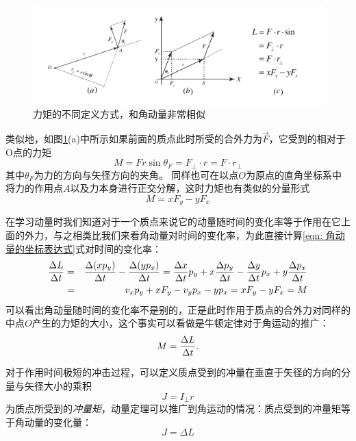 \begin{figure}[htbp]
\begin{center}
\includegraphics{images/angular-momentum-def-torque.pdf}
\caption{力矩的不同定义方式，和角动量非常相似}
\label{fig: def of torque}
\end{center}
\end{figure}
类似地，如图\ref{fig: def of torque}(a)中所示如果前面的质点此时所受的合外力为$\vec{F}$，它受到的相对于O点的力矩
\begin{equation}
M = F r \sin\theta_F = F_\perp\cdot r=F\cdot r_\perp
\end{equation}
其中$\theta_F$为力的方向与矢径方向的夹角。
同样也可在以点$O$为原点的直角坐标系中将力的作用点$A$以及力本身进行正交分解，这时力矩也有类似的分量形式
\begin{equation}\label{eqn: 力矩的分量形式}
M = xF_y - yF_x
\end{equation}

在学习动量时我们知道对于一个质点来说它的动量随时间的变化率等于作用在它上面的外力，与之相类比我们来看角动量对时间的变化率，为此直接计算\ref{eqn: 角动量的坐标表达式}式对时间的变化率：
\begin{eqnarray*}
\frac{\Delta L}{\Delta t}&=&\frac{\Delta (xp_y)}{\Delta t}-\frac{\Delta (yp_x)}{\Delta t} = \frac{\Delta x}{\Delta t}p_y+x\frac{\Delta p_y}{\Delta t}-\frac{\Delta y}{\Delta t}p_x+y\frac{\Delta p_x}{\Delta t}\\
&=& v_x p_y+xF_y-v_yp_x-yp_x = xF_y-yF_x = M
\end{eqnarray*}
可以看出角动量随时间的变化率不是别的，正是此时作用于质点的合外力对同样的中点$O$产生的力矩的大小，这个事实可以看做是牛顿定律对于角运动的推广：
\begin{equation}\label{eqn: 角动量定律}
M = \frac{\Delta L}{\Delta t}.
\end{equation}

对于作用时间极短的冲击过程，可以定义质点受到的冲量在垂直于矢径的方向的分量与矢径大小的乘积
\begin{equation}
J = I_\perp r
\end{equation}
为质点所受到的\emph{冲量矩}，动量定理可以推广到角运动的情况：质点受到的冲量矩等于角动量的变化量：
\begin{equation}
J = \Delta L
\end{equation}

